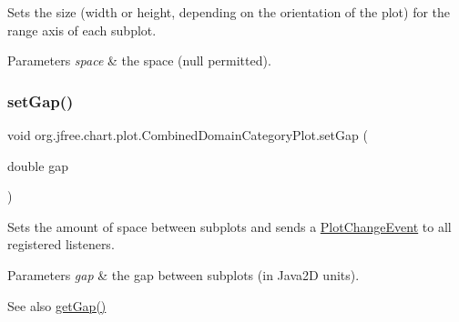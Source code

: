 Sets the size (width or height, depending on the orientation of the plot) for the range axis of each subplot.


\begin{DoxyParams}{Parameters}
{\em space} & the space ({\ttfamily null} permitted). \\
\hline
\end{DoxyParams}
\mbox{\label{classorg_1_1jfree_1_1chart_1_1plot_1_1_combined_domain_category_plot_a5d3f10078a53b2b557c02884c04b8615}} 
\subsubsection{\texorpdfstring{set\+Gap()}{setGap()}}
{\footnotesize\ttfamily void org.\+jfree.\+chart.\+plot.\+Combined\+Domain\+Category\+Plot.\+set\+Gap (\begin{DoxyParamCaption}\item[{double}]{gap }\end{DoxyParamCaption})}

Sets the amount of space between subplots and sends a \mbox{\hyperlink{}{Plot\+Change\+Event}} to all registered listeners.


\begin{DoxyParams}{Parameters}
{\em gap} & the gap between subplots (in Java2D units).\\
\hline
\end{DoxyParams}
\begin{DoxySeeAlso}{See also}
\mbox{\hyperlink{classorg_1_1jfree_1_1chart_1_1plot_1_1_combined_domain_category_plot_a6316f0e91e8db920b189872374719969}{get\+Gap()}} 
\end{DoxySeeAlso}
\mbox{\label{classorg_1_1jfree_1_1chart_1_1plot_1_1_combined_domain_category_plot_ae0c4fbaa5588c5708476c0344e7d3044}} 
